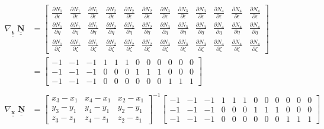 \documentclass[12pt]{article}
\def\doubleunderline#1{\underline{\underline{#1}}}
\def\diffp[#1]#2{\frac{\partial#1}{\partial#2}}
\def\mt#1{\underline{\underline{\mathbf{#1}}}}
\newcommand{\nb}{\doubleunderline{\mathbf{N}}}
\begin{document}
\begin{align*}
\nabla_{\mt{\epsilon}} \; \nb &=
\begin{bmatrix}
	\diffp[N_1]{\epsilon} & \diffp[N_1]{\epsilon} & \diffp[N_1]{\epsilon} & \diffp[N_2]{\epsilon} & \diffp[N_2]{\epsilon} & \diffp[N_2]{\epsilon} & \diffp[N_3]{\epsilon} & \diffp[N_3]{\epsilon} & \diffp[N_3]{\epsilon} & \diffp[N_4]{\epsilon} & \diffp[N_4]{\epsilon} & \diffp[N_4]{\epsilon} \\ 
	\diffp[N_1]{\eta} & \diffp[N_1]{\eta} & \diffp[N_1]{\eta} & \diffp[N_2]{\eta} & \diffp[N_2]{\eta} & \diffp[N_2]{\eta} & \diffp[N_3]{\eta} & \diffp[N_3]{\eta} & \diffp[N_3]{\eta} & \diffp[N_4]{\eta} & \diffp[N_4]{\eta} & \diffp[N_4]{\eta} \\ 
	\diffp[N_1]{\zeta} & \diffp[N_1]{\zeta} & \diffp[N_1]{\zeta} & \diffp[N_2]{\zeta} & \diffp[N_2]{\zeta} & \diffp[N_2]{\zeta} & \diffp[N_3]{\zeta} & \diffp[N_3]{\zeta} & \diffp[N_3]{\zeta} & \diffp[N_4]{\zeta} & \diffp[N_4]{\zeta} & \diffp[N_4]{\zeta}
\end{bmatrix}
\\
&=
\begin{bmatrix}
	-1 & -1 & -1 & 1 & 1 & 1 & 0 & 0 & 0 & 0 & 0 & 0 \\ 
	-1 & -1 & -1 & 0 & 0 & 0 & 1 & 1 & 1 & 0 & 0 & 0 \\ 
	-1 & -1 & -1 & 0 & 0 & 0 & 0 & 0 & 0 & 1 & 1 & 1
\end{bmatrix}
\\ \\
\nabla_{\mt{x}} \; \nb &=
\begin{bmatrix}
	x_3 - x_1 & x_4 - x_1 & x_2 - x_1 \\
	y_3 - y_1 & y_4 - y_1 & y_2 - y_1 \\
	z_3 - z_1 & z_4 - z_1 & z_2 - z_1
\end{bmatrix}^{-1}
\begin{bmatrix}
	-1 & -1 & -1 & 1 & 1 & 1 & 0 & 0 & 0 & 0 & 0 & 0 \\ 
	-1 & -1 & -1 & 0 & 0 & 0 & 1 & 1 & 1 & 0 & 0 & 0 \\ 
	-1 & -1 & -1 & 0 & 0 & 0 & 0 & 0 & 0 & 1 & 1 & 1
\end{bmatrix}
\end{align*}
\end{document}
